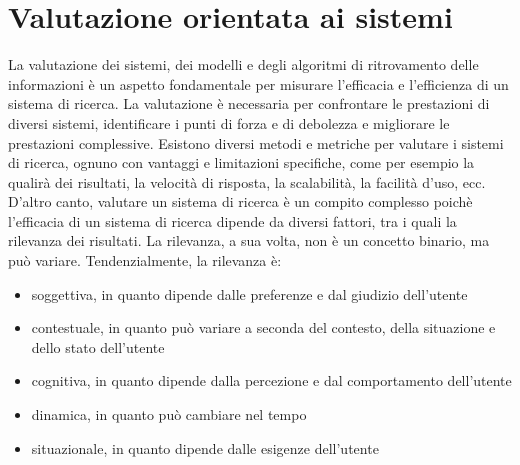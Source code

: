 \documentclass{report}
\begin{document}
	\chapter{Valutazione orientata ai sistemi}
	La valutazione dei sistemi, dei modelli e degli algoritmi di ritrovamento delle informazioni è un aspetto fondamentale per misurare l'efficacia e l'efficienza di un sistema di ricerca. La valutazione è necessaria per confrontare le prestazioni di diversi sistemi, identificare i punti di forza e di debolezza e migliorare le prestazioni complessive. Esistono diversi metodi e metriche per valutare i sistemi di ricerca, ognuno con vantaggi e limitazioni specifiche, come per esempio la qualirà dei risultati, la velocità di risposta, la scalabilità, la facilità d'uso, ecc.
	\vspace{\baselineskip}\\
	D'altro canto, valutare un sistema di ricerca è un compito complesso poichè l'efficacia di un sistema di ricerca dipende da diversi fattori, tra i quali la rilevanza dei risultati. La rilevanza, a sua volta, non è un concetto binario, ma può variare. Tendenzialmente, la rilevanza è:
	\begin{itemize}
		\item soggettiva, in quanto dipende dalle preferenze e dal giudizio dell'utente
		\item contestuale, in quanto può variare a seconda del contesto, della situazione e dello stato dell'utente
		\item cognitiva, in quanto dipende dalla percezione e dal comportamento dell'utente
		\item dinamica, in quanto può cambiare nel tempo
		\item situazionale, in quanto dipende dalle esigenze dell'utente
	\end{itemize}
\end{document}
